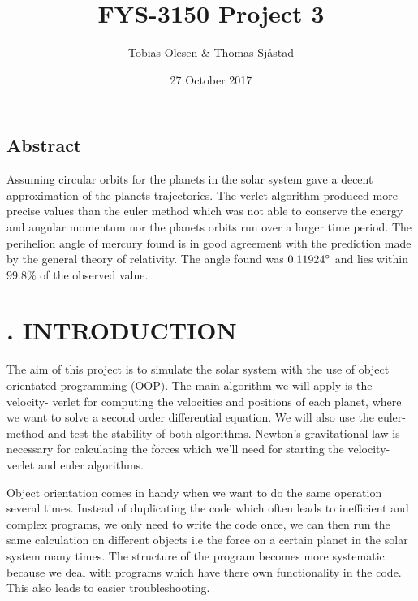 \documentclass[twocolumn]{article}
\begin{document}
\title{\vspace{-2.5cm}FYS-3150 Project 3}
\author{Tobias Olesen & Thomas Sjåstad}
\date{27 October 2017}
\maketitle
\onecolumngrid
\noindent\makebox[\linewidth]{\rule{\paperwidth}{0.4pt}}
\begin{center}
\section*{Abstract}
Assuming circular orbits for the planets in the solar system gave a decent approximation of the planets trajectories. The verlet algorithm produced more precise values than the euler method which was not able to conserve the energy and angular momentum nor the planets orbits run over a larger time period. The perihelion angle of mercury found is in good agreement with the prediction made by the general theory of relativity. The angle found was $0.11924\degree$ and lies within $99.8\%$ of the observed value. 
\end{center}  
\noindent\makebox[\linewidth]{\rule{\paperwidth}{0.4pt}}
\newline
\twocolumngrid
\section*{. INTRODUCTION}
The aim of this project is to simulate the solar system with the use of object orientated programming (OOP). The main algorithm we will apply is the velocity- verlet for computing the velocities and positions of each planet, where we want to solve a second order differential equation. We will also use the euler-method and test the stability of both algorithms. Newton's gravitational law is necessary for calculating the forces which we'll need for starting the velocity-verlet and euler algorithms.

Object orientation comes in handy when we want to do the same operation several times. Instead of duplicating the code which often leads to inefficient and complex programs, we only need to write the code once, we can then run the same calculation on different objects i.e the force on a certain planet in the solar system many times. The structure of the program becomes more systematic because we deal with programs which have there own functionality in the code. This also leads to easier troubleshooting.
\end{document}
